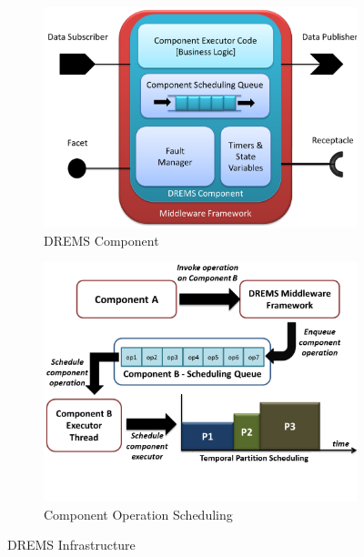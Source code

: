 \begin{figure}[t]
	\centering
	\begin{subfigure}[b]{0.5\textwidth}
		\includegraphics[width=\textwidth]{./figs/drems_component}
		\caption{DREMS Component}
		\label{fig:drems_component}
	\end{subfigure}%
	\begin{subfigure}[b]{0.5\textwidth}
		\includegraphics[width=\textwidth]{./figs/component_operations}
		\caption{Component Operation Scheduling}
		\label{fig:component_operations}
	\end{subfigure}
	\caption{DREMS Infrastructure}\label{fig:DI}
\vspace{-0.2in}
\end{figure}


